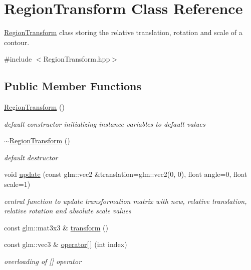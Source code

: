 \hypertarget{class_region_transform}{}\section{Region\+Transform Class Reference}
\label{class_region_transform}


\mbox{\hyperlink{class_region_transform}{Region\+Transform}} class storing the relative translation, rotation and scale of a contour.  




{\ttfamily \#include $<$Region\+Transform.\+hpp$>$}

\subsection*{Public Member Functions}
\begin{DoxyCompactItemize}
\item 
\mbox{\hyperlink{class_region_transform_aafca68cc04b354ff4a5a6e7d341af492}{Region\+Transform}} ()
\begin{DoxyCompactList}\small\item\em default constructor initializing instance variables to default values \end{DoxyCompactList}\item 
\mbox{\hyperlink{class_region_transform_a94c5436c4f558879d920c97eb9e20611}{$\sim$\+Region\+Transform}} ()
\begin{DoxyCompactList}\small\item\em default destructor \end{DoxyCompactList}\item 
void \mbox{\hyperlink{class_region_transform_a8d6734d6536be0811d41bf2287d401d9}{update}} (const glm\+::vec2 \&translation=glm\+::vec2(0, 0), float angle=0, float scale=1)
\begin{DoxyCompactList}\small\item\em central function to update transformation matrix with new, relative translation, relative rotation and absolute scale values \end{DoxyCompactList}\item 
const glm\+::mat3x3 \& \mbox{\hyperlink{class_region_transform_aa55bac64aa3c3d7210c586be0e481b95}{transform}} ()
\item 
const glm\+::vec3 \& \mbox{\hyperlink{class_region_transform_a5ef023995359c8ed01ecfac62a6b1ee4}{operator\mbox{[}$\,$\mbox{]}}} (int index)
\begin{DoxyCompactList}\small\item\em overloading of \mbox{[}\mbox{]} operator \end{DoxyCompactList}\end{DoxyCompactItemize}


